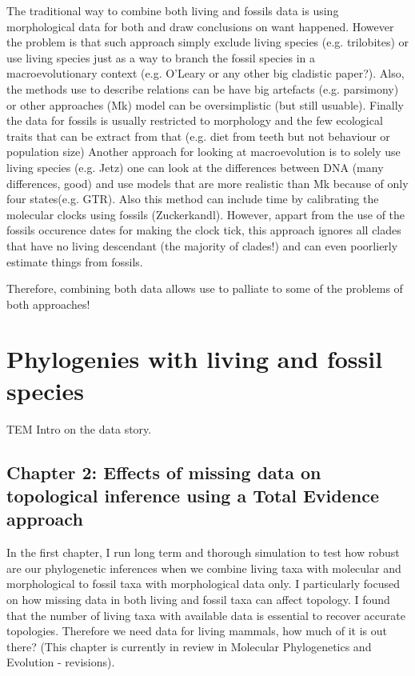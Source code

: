 The traditional way to combine both living and fossils data is using morphological data for both and draw conclusions on want happened.
However the problem is that such approach simply exclude living species (e.g. trilobites) or use living species just as a way to branch the fossil species in a macroevolutionary context (e.g. O'Leary or any other big cladistic paper?).
Also, the methods use to describe relations can be have big artefacts (e.g. parsimony) or other approaches (Mk) model can be oversimplistic (but still usuable).
Finally the data for fossils is usually restricted to morphology and the few ecological traits that can be extract from that (e.g. diet from teeth but not behaviour or population size)
Another approach for looking at macroevolution is to solely use living species (e.g. Jetz) one can look at the differences between DNA (many differences, good) and use models that are more realistic than Mk because of only four states(e.g. GTR).
Also this method can include time by calibrating the molecular clocks using fossils (Zuckerkandl).
However, appart from the use of the fossils occurence dates for making the clock tick, this approach ignores all clades that have no living descendant (the majority of clades!) and can even poorlierly estimate things from fossils.

Therefore, combining both data allows use to palliate to some of the problems of both approaches!




\section{Phylogenies with living and fossil species}

TEM Intro on the data story.

\subsection{Chapter 2: Effects of missing data on topological inference using a Total Evidence approach}

In the first chapter, I run long term and thorough simulation to test how robust are our phylogenetic inferences when we combine living taxa with molecular and morphological to fossil taxa with morphological data only.
I particularly focused on how missing data in both living and fossil taxa can affect topology.
I found that the number of living taxa with available data is essential to recover accurate topologies.
Therefore we need data for living mammals, how much of it is out there?
(This chapter is currently in review in Molecular Phylogenetics and Evolution - revisions).

